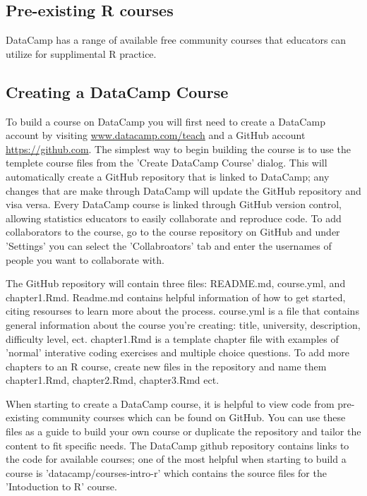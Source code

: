 \documentclass[12pt]{article}
\begin{document}
\subsection{Pre-existing R courses}
DataCamp has a range of available free community courses that educators can utilize for supplimental R practice.

\subsection{Creating a DataCamp Course}
To build a course on DataCamp you will first need to create a DataCamp account by visiting \url{www.datacamp.com/teach} and
a GitHub account \url{https://github.com}. The simplest way to begin building the course is to use the templete course files from the 'Create
DataCamp Course' dialog. This will automatically create a GitHub repository that is linked to DataCamp; any changes that are
make through DataCamp will update the GitHub repository and visa versa. Every DataCamp course is linked through GitHub version control,
allowing statistics educators to easily collaborate and reproduce code. To add collaborators to the course, go to the course repository
on GitHub and under 'Settings' you can select the 'Collabroators' tab and enter the usernames of people you want to collaborate with.



The GitHub repository will contain three files: README.md, course.yml, and chapter1.Rmd.
Readme.md contains helpful information of how to get started, citing resourses to learn more about the process.
course.yml is a file that contains general information about the course you're creating: title, university, description,
difficulty level, ect.
chapter1.Rmd is a template chapter file with examples of 'normal' interative coding exercises and multiple choice questions.
To add more chapters to an R course, create new files in the repository and name them chapter1.Rmd, chapter2.Rmd, chapter3.Rmd
ect.

When starting to create a DataCamp course, it is helpful to view code from pre-existing community courses which can be found on GitHub.
You can use these files as a guide to build your own course or duplicate the repository and tailor the content to fit specific needs.
The DataCamp github repository contains links to the code for available courses; one of the most helpful when starting to build a course 
is 'datacamp/courses-intro-r' which contains the source files for the 'Intoduction to R' course.
\end{document}
